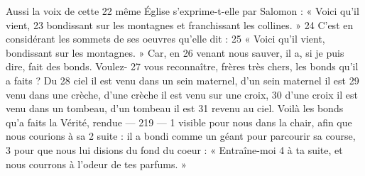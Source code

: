 Aussi la voix de cette	 
22	 	même Église s'exprime-t-elle par Salomon : « Voici qu'il vient,	 
23	 	bondissant sur les montagnes et franchissant les collines. »	 
24	 	C'est en considérant les sommets de ses oeuvres qu'elle dit :	 
25	 	« Voici qu'il vient, bondissant sur les montagnes. » Car, en	 
26	 	venant nous sauver, il a, si je puis dire, fait des bonds. Voulez-	 
27	 	vous reconnaître, frères très chers, les bonds qu'il a faits ? Du	 
28	 	ciel il est venu dans un sein maternel, d'un sein maternel il est	 
29	 	venu dans une crèche, d'une crèche il est venu sur une croix,	 
30	 	d'une croix il est venu dans un tombeau, d'un tombeau il est	 
31	 	revenu au ciel. Voilà les bonds qu'a faits la Vérité, rendue	 
 	--- 219 ---	 
1	 	visible pour nous dans la chair, afin que nous courions à sa	 
2	 	suite : il a bondi comme un géant pour parcourir sa course,	 
3	 	pour que nous lui disions du fond du coeur : « Entraîne-moi	 
4	 	à ta suite, et nous courrons à l'odeur de tes parfums. »